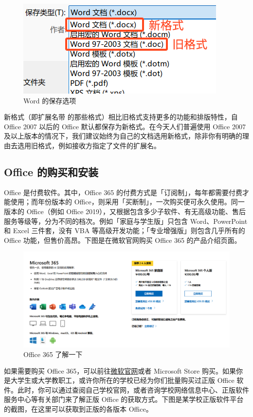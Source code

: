 \begin{figure}[htb!]
  \centering
  \includegraphics[width=.6\textwidth]{assets/software/Word_formats.png}
  \caption{Word 的保存选项}
  \label{fig:Word_formats}
\end{figure}

新格式（即扩展名带  的那些格式）相比旧格式支持更多的功能和排版特性，自 Office 2007 以后的 Office 默认都保存为新格式。在今天人们普遍使用 Office 2007 及以上版本的情况下，我们建议始终为自己的文档选用新格式，除非你有明确的理由去选用旧格式，例如接收方指定了文件的扩展名。

\subsection{Office 的购买和安装}

Office 是付费软件。其中，Office 365 的付费方式是「订阅制」，每年都需要付费才能使用；而年份版本的 Office，则采用「买断制」，一次购买便可永久使用。同一版本的 Office（例如 Office 2019），又根据包含多少子软件、有无高级功能、售后服务等级等，分为不同的档次。例如「家庭与学生版」只包含 Word、PowerPoint 和 Excel 三件套，没有 VBA 等高级开发功能；「专业增强版」则包含几乎所有的 Office 功能，但售价高昂。下图是在微软官网购买 Office 365 的产品介绍页面。

\begin{figure}[htb!]
  \centering
  \includegraphics[width=12cm]{assets/software/Buying_Office_365.png}
  \caption{Office 365 了解一下}
  \label{fig:Buying_Office_365}
\end{figure}

如果需要购买 Office 365，可以前往\href{https://www.microsoft.com/zh-CN/microsoft-365/buy/microsoft-365}{微软官网}或者 Microsoft Store 购买。如果你是大学生或大学教职工，或许你所在的学校已经为你们批量购买过正版 Office 软件。此时，你可以通过查阅自己学校官网，或者咨询学校网络信息中心、正版软件服务中心等有关部门来了解正版 Office 的获取方式。下图是某学校正版软件平台的截图，在这里可以获取到正版的各版本 Office。

